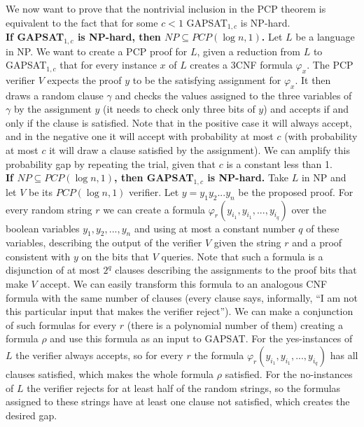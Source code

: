 \documentclass{llncs}
\begin{document}
We now want to prove that the nontrivial inclusion in the PCP theorem is equivalent to the fact that for some $c<1$ GAPSAT$_{1,c}$ is NP-hard.
\\

{\bf If GAPSAT$_{1,c}$ is NP-hard, then $NP \subseteq PCP(\log n, 1)$.} Let $L$ be a language in NP. We want to create a PCP proof for $L$, given a reduction from $L$ to GAPSAT$_{1,c}$ that for every instance $x$ of $L$ creates a 3CNF formula $\varphi_x$. The PCP verifier $V$ expects the proof $y$ to be the satisfying assignment for $\varphi_x$. It then draws a random clause $\gamma$ and checks the values assigned to the three variables of $\gamma$ by the assignment $y$ (it needs to check only three bits of $y$) and accepts if and only if the clause is satisfied. Note that in the positive case it will always accept, and in the negative one it will accept with probability at most $c$ (with probability at most $c$ it will draw a clause satisfied by the assignment). We can amplify this probability gap by repeating the trial, given that $c$ is a constant less than 1.
\\

{\bf If $NP \subseteq PCP(\log n, 1)$, then GAPSAT$_{1,c}$ is NP-hard.} Take $L$ in NP and let $V$ be its $PCP(\log n, 1)$ verifier. Let $y = y_1 y_2 ... y_n$ be the proposed proof. For every random string $r$ we can create a formula $\varphi_r(y_{i_1}, y_{i_1}, ..., y_{i_q})$ over the boolean variables $y_1, y_2, ..., y_n$ and using at most a constant number $q$ of these variables, describing the output of the verifier $V$ given the string $r$ and a proof consistent with $y$ on the bits that $V$ queries. Note that such a formula is a disjunction of at most $2^q$ clauses describing the assignments to the proof bits that make $V$ accept. We can easily transform this formula to an analogous CNF formula with the same number of clauses (every clause says, informally, ``I am not this particular input that makes the verifier reject''). We can make a conjunction of such formulas for every $r$ (there is a polynomial number of them) creating a formula $\rho$ and use this formula as an input to GAPSAT. For the yes-instances of $L$ the verifier always accepts, so for every $r$ the formula $\varphi_r(y_{i_1}, y_{i_1}, ..., y_{i_q})$ has all clauses satisfied, which makes the whole formula $\rho$ satisfied. For the no-instances of $L$ the verifier rejects for at least half of the random strings, so the formulas assigned to these strings have at least one clause not satisfied, which creates the desired gap.
\end{document}
